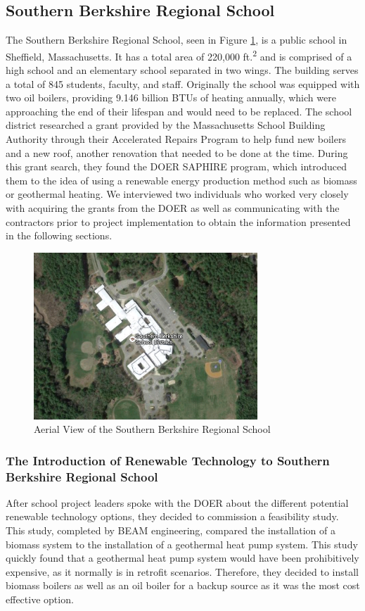\subsection{Southern Berkshire Regional School}
\par The Southern Berkshire Regional School, seen in Figure \ref{fig:sbrs}, is a public school in Sheffield, Massachusetts. It has a total area of 220,000 ft.\textsuperscript{2} and is comprised of a high school and an elementary school separated in two wings. The building serves a total of 845 students, faculty, and staff. Originally the school was equipped with two oil boilers, providing 9.146 billion BTUs of heating annually, which were approaching the end of their lifespan and would need to be replaced. The school district researched a grant provided by the Massachusetts School Building Authority through their Accelerated Repairs Program to help fund new boilers and a new roof, another renovation that needed to be done at the time. During this grant search, they found the DOER SAPHIRE program, which introduced them to the idea of using a renewable energy production method such as biomass or geothermal heating. We interviewed two individuals who worked very closely with acquiring the grants from the DOER as well as communicating with the contractors prior to project implementation to obtain the information presented in the following sections.
\begin{figure}[H]
\centering
\includegraphics[width=0.75\textwidth]{findingschapter/southernberkshireschool}
\caption{Aerial View of the Southern Berkshire Regional School}
\label{fig:sbrs}
\end{figure}

\subsubsection{The Introduction of Renewable Technology to Southern Berkshire Regional School}
\par After school project leaders spoke with the DOER about the different potential renewable technology options, they decided to commission a feasibility study. This study, completed by BEAM engineering, compared the installation of a biomass system to the installation of a geothermal heat pump system. This study quickly found that a geothermal heat pump system would have been prohibitively expensive, as it normally is in retrofit scenarios.  Therefore, they decided to install biomass boilers as well as an oil boiler for a backup source as it was the most cost effective option.

